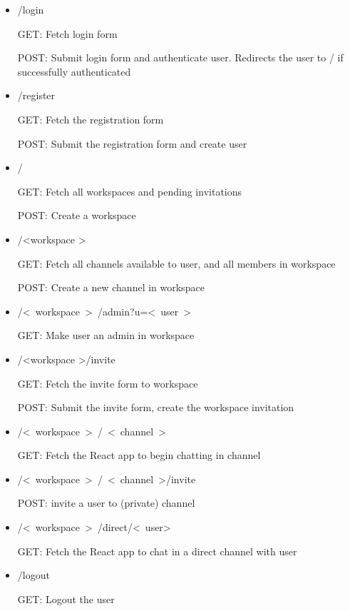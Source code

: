 \documentclass{article}
\begin{document}
\begin{itemize}

\item
  /login

  GET: Fetch login form

  POST: Submit login form and authenticate user. Redirects the user to / if successfully authenticated

\item
/register

  GET: Fetch the registration form

  POST: Submit the registration form and create user

\item
/

  GET: Fetch all workspaces and pending invitations

  POST: Create a workspace

\item
/\textless workspace \textgreater

  GET: Fetch all channels available to user, and all members in workspace

  POST: Create a new channel in workspace

\item
/\textless~workspace~\textgreater~/admin?u=\textless~user~\textgreater

  GET: Make user an admin in workspace

\item
/\textless workspace \textgreater /invite

  GET: Fetch the invite form to workspace

  POST: Submit the invite form, create the workspace invitation

\item
/\textless~workspace~\textgreater~/~\textless~channel~\textgreater

  GET: Fetch the React app to begin chatting in channel

\item
/\textless~workspace~\textgreater~/~\textless~channel~\textgreater/invite

  POST: invite a user to (private) channel

\item
/\textless~workspace~\textgreater~/direct/\textless~user\textgreater

  GET: Fetch the React app to chat in a direct channel with user

\item
/logout

  GET: Logout the user

\end{itemize}
\end{document}
